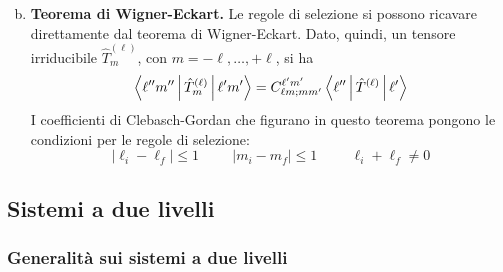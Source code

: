 \documentclass[11pt, a4paper]{scrartcl} %
\numberwithin{equation}{subsection}
\theoremstyle{style2}
\theoremstyle{style1}
\newenvironment{boxenv}[1][]{
    \begin{eqbox}[#1]
    }{
   \end{eqbox}
}
\begin{document}
\begin{enumerate}[(a).]
\begin{boxenv}[]
\begin{equation}
	\end{equation}
	\end{boxenv}
	\item {\sffamily \bfseries Teorema di Wigner-Eckart.} Le regole di selezione si possono ricavare direttamente dal teorema di Wigner-Eckart. 
		Dato, quindi, un tensore irriducibile $\hat{T}^{(\ell  )} _m$, con $m = -\ell ,\ldots,+\ell $, si ha
		\[
		\Braket{\ell '' m''|\hat{T}^{(\ell )} _m|\ell' m'} = C^{\ell 'm'} _{\ell m; mm' } \Braket{\ell ''|\hat{T}^{(\ell )} |\ell '} 
		\] 
		I coefficienti di Clebasch-Gordan che figurano in questo teorema pongono le condizioni per le regole di selezione:
		\[
		\lvert \ell _i - \ell _f \rvert \le  1 \hspace{1cm} \lvert m_i - m_f \rvert \le 1 \hspace{1cm} \ell _i + \ell _f \neq 0 
		\] 
\end{enumerate}
\subsection{Sistemi a due livelli}


\subsubsection{Generalit\`a sui sistemi a due livelli}\label{2lsys}
\end{document}
